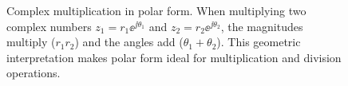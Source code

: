 \begin{figure}[htbp]
\caption{Complex multiplication in polar form. When multiplying two complex numbers $z_1 = r_1\ee^{\jj\theta_1}$ and $z_2 = r_2\ee^{\jj\theta_2}$, the magnitudes multiply ($r_1 r_2$) and the angles add ($\theta_1 + \theta_2$). This geometric interpretation makes polar form ideal for multiplication and division operations.}
\label{fig:complex_multiplication}
\end{figure}

